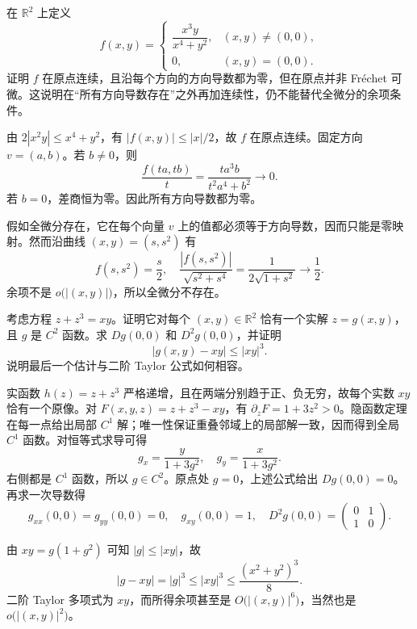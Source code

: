 \begin{exercise}\label{b2:ex:01-directional-continuous}
在 \(\mathbb R^2\) 上定义
\[
 f(x,y)=
 \begin{cases}
 \dfrac{x^3y}{x^4+y^2},&(x,y)\ne(0,0),\\
 0,&(x,y)=(0,0).
 \end{cases}
\]
证明 \(f\) 在原点连续，且沿每个方向的方向导数都为零，但在原点并非 Fréchet 可微。这说明在“所有方向导数存在”之外再加连续性，仍不能替代全微分的余项条件。
\end{exercise}
\begin{solution}
由 \(2|x^2y|\leq x^4+y^2\)，有 \(|f(x,y)|\leq |x|/2\)，故 \(f\) 在原点连续。固定方向 \(v=(a,b)\)。若 \(b\ne0\)，则
\[
 \dfrac{f(ta,tb)}{t}
 =\dfrac{t a^3b}{t^2a^4+b^2}\longrightarrow0.
\]
若 \(b=0\)，差商恒为零。因此所有方向导数都为零。

假如全微分存在，它在每个向量 \(v\) 上的值都必须等于方向导数，因而只能是零映射。然而沿曲线 \((x,y)=(s,s^2)\) 有
\[
 f(s,s^2)=\dfrac{s}{2},\quad
 \dfrac{|f(s,s^2)|}{\sqrt{s^2+s^4}}
 =\dfrac{1}{2\sqrt{1+s^2}}\longrightarrow\dfrac12.
\]
余项不是 \(o\bigl(|(x,y)|\bigr)\)，所以全微分不存在。
\end{solution}

\begin{exercise}\label{b2:ex:01-implicit-global}
考虑方程 \(z+z^3=xy\)。证明它对每个 \((x,y)\in\mathbb R^2\) 恰有一个实解 \(z=g(x,y)\)，且 \(g\) 是 \(C^2\) 函数。求 \(Dg(0,0)\) 和 \(D^2g(0,0)\)，并证明
\[
 |g(x,y)-xy|\leq |xy|^3.
\]
说明最后一个估计与二阶 Taylor 公式如何相容。
\end{exercise}
\begin{solution}
实函数 \(h(z)=z+z^3\) 严格递增，且在两端分别趋于正、负无穷，故每个实数 \(xy\) 恰有一个原像。对 \(F(x,y,z)=z+z^3-xy\)，有 \(\partial_zF=1+3z^2>0\)。隐函数定理在每一点给出局部 \(C^1\) 解；唯一性保证重叠邻域上的局部解一致，因而得到全局 \(C^1\) 函数。对恒等式求导可得
\[
 g_x=\dfrac{y}{1+3g^2},\quad
 g_y=\dfrac{x}{1+3g^2}.
\]
右侧都是 \(C^1\) 函数，所以 \(g\in C^2\)。原点处 \(g=0\)，上述公式给出 \(Dg(0,0)=0\)。再求一次导数得
\[
 g_{xx}(0,0)=g_{yy}(0,0)=0,\quad g_{xy}(0,0)=1,
 \quad D^2g(0,0)=\begin{pmatrix}0&1\\1&0\end{pmatrix}.
\]

由 \(xy=g(1+g^2)\) 可知 \(|g|\leq|xy|\)，故
\[
 |g-xy|=|g|^3\leq|xy|^3
 \leq\dfrac{(x^2+y^2)^3}{8}.
\]
二阶 Taylor 多项式为 \(xy\)，而所得余项甚至是 \(O\bigl(|(x,y)|^6\bigr)\)，当然也是 \(o\bigl(|(x,y)|^2\bigr)\)。
\end{solution}

